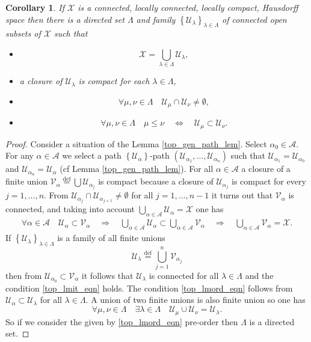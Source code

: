 \documentclass[10]{article}
\theoremstyle{plain}
\newtheorem{corollary}[prop]{Corollary}
\theoremstyle{definition}
\theoremstyle{definition}
\numberwithin{equation}{section}
\renewcommand{\a}{\alpha}                    %
\newcommand{\La}{\Lambda}                    %
\newcommand{\la}{\lambda}                    %
\newcommand{\7}{\dagger}                     %
\newcommand{\8}{\bullet}                     %
\renewcommand{\.}{\cdot}                     %
\renewcommand{\:}{\colon}                    %
\newcommand{\sU}{\mathcal{U}}       %
\newcommand{\sV}{\mathcal{V}}       %
\newcommand{\sX}{\mathcal{X}}       %
\newcommand{\bydef}{\stackrel{\mathrm{def}}{=}}          %
\renewcommand{\:}{\colon}           %
\def\ee_#1{e_{{\scriptscriptstyle#1}}}       %
\newcommand{\be}{\begin{equation}}
\renewcommand{\ee}{\end{equation}}
\newcommand{\bean}{\begin{eqnarray*}}
\newcommand{\eean}{\end{eqnarray*}}
\begin{document}
		\begin{corollary}\label{top_connected_union_cor}
			If $\sX$ is a connected, locally connected, locally compact, Hausdorff space  then there is a  directed set $\La$ and  family $\left\{\sU_\la\right\}_{\la\in\La}$ of connected open subsets of $\sX$ such that
			\begin{itemize}
				\item 
				$$
				\sX = \bigcup_{\la\in \La}\sU_\la,
				$$
				\item a closure of $\sU_\la$ is compact for each $\la\in \La$,
				\item
				\be\label{top_lmit_eqn}
				\forall \mu, \nu \in \La  \quad \sU_\mu \cap \sU_\nu \neq \emptyset,
				\ee
				\item
				\be\label{top_lmord_eqn}
				\forall \mu, \nu \in \La \quad \mu \le \nu\quad\Leftrightarrow \quad \sU_\mu \subset \sU_\nu.
				\ee
			\end{itemize}
		\end{corollary}
		\begin{proof}
			Consider a situation of the Lemma \ref{top_gen_path_lem}. Select $\a_0 \in \mathscr A$. For any $\a\in \mathscr A$ we select a path $\left\{\sU_\a\right\}$-{path} $\left(\sU_{\a_1},...,\sU_{\a_n}\right)$ such that $\sU_{\a_1}=\sU_{\a_0}$ and $\sU_{\a_n}=\sU_{\a}$ (cf Lemma \ref{top_gen_path_lem}). For all $\a \in \mathscr A$ a closure of a finite union $\sV_{\a}\bydef \bigcup \sU_{\a_j}$ is compact because a closure of $\sU_{\a_j}$ is compact for every $j = 1,..., n$. From $\sU_{\a_j}\cap \sU_{\a_{j+1}}\neq \emptyset$ for all $j=1,...,n-1$ it turns out that $\sV_{\a}$ is connected, and taking into account $\bigcup_{\a\in \mathscr A}\sU_\a = \sX$ one has 
			\bean
			\forall \a\in \mathscr A \quad  \sU_\a\subset \sV_\a\quad \Rightarrow\quad \bigcup_{\a\in \mathscr A}\sU_\a\subset \bigcup_{\a\in \mathscr A}\sV_\a \quad \Rightarrow\quad\bigcup_{\a\in \mathscr A}\sV_\a= \sX.
			\eean 
			If $\left\{\sU_\la\right\}_{\la \in \La}$ is a family of all finite unions  $$\sU_\la\bydef \bigcup_{j=1}^n \sV_{\a_j}$$ then from $\sU_{\a_0} \subset \sV_{\a}$ it follows that $\sU_\la$ is connected for all $\la \in \La$ and the condition \ref{top_lmit_eqn} holds.
			The condition \eqref{top_lmord_eqn} follows from $\sU_\a \subset \sU_\la$ for all $\la\in \La$.
			A union of two finite unions is also finite union so one has
			$$
			\forall \mu, \nu \in \La\quad \exists \la \in \La\quad \sU_\mu \cup \sU_\nu = \sU_\la.
			$$
			So if we consider the given by \eqref{top_lmord_eqn} pre-order then $\La$ is a directed set.	
		\end{proof}
		
\end{document}
